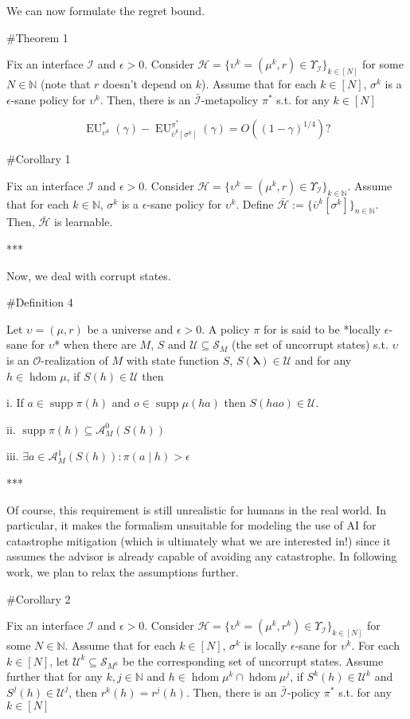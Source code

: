\documentclass[a4paper]{article}
\DeclareMathOperator{\Supp}{supp}
\newcommand{\Nats}{\mathbb{N}}
\newcommand{\Sq}[2]{\{#1\}_{#2 \in \Nats}}
\newcommand{\Sqn}[1]{\Sq{#1}{n}}
\newcommand{\Estr}{\boldsymbol{\lambda}}
\newcommand{\Ob}{\mathcal{O}}
\newcommand{\A}{\mathcal{A}}
\newcommand{\St}{\mathcal{S}}
\newcommand{\In}{\mathcal{I}}
\DeclareMathOperator{\HD}{hdom}
\newcommand{\Hy}{\mathcal{H}}
\newcommand{\UC}{\mathcal{U}}
\newcommand{\EU}{\operatorname{EU}}
\begin{document}
We can now formulate the regret bound.

\#Theorem 1

Fix an interface $\In$ and $\epsilon > 0$. Consider $\Hy = \{\upsilon^k = (\mu^k,r) \in \Upsilon_{\In}\}_{k \in [N]}$ for some $N \in \Nats$ (note that $r$ doesn't depend on $k$). Assume that for each $k \in [N]$, $\sigma^k$ is a $\epsilon$-sane policy for $\upsilon^k$. Then, there is an $\bar{\In}$-metapolicy $\pi^*$ s.t. for any $k \in [N]$

$$\EU_{\upsilon^k}^*(\gamma) - \EU_{\bar{\upsilon}^k\left[\sigma^k\right]}^{\pi^*}(\gamma) = O\left((1-\gamma)^{1/4}\right)?$$

\#Corollary 1

Fix an interface $\In$ and $\epsilon > 0$. Consider $\Hy = \{\upsilon^k = (\mu^k,r) \in \Upsilon_{\In}\}_{k \in \Nats}$. Assume that for each $k \in \Nats$, $\sigma^k$ is a $\epsilon$-sane policy for $\upsilon^k$. Define $\bar{\Hy}:=\Sqn{\bar{\upsilon}^k\left[\sigma^k\right]}$. Then, $\bar{\Hy}$ is learnable.

***

Now, we deal with corrupt states.

\#Definition 4

Let $\upsilon = (\mu,r)$ be a universe and $\epsilon > 0$. A policy $\pi$ for is said to be *locally $\epsilon$-sane for $\upsilon$* when there are $M$, $S$ and $\UC \subseteq \St_M$ (the set of uncorrupt states) s.t. $\upsilon$ is an $\Ob$-realization of $M$ with state function $S$, $S(\Estr) \in \UC$ and for any $h \in \HD{\mu}$, if $S(h) \in \UC$ then

i. If $a \in \Supp{\pi(h)}$ and $o \in \Supp{\mu(ha)}$ then $S\left(hao\right) \in \UC$.

ii. $\Supp{\pi(h)} \subseteq \A_M^0\left(S(h)\right)$

iii. $\exists a \in \A_M^1\left(S(h)\right): \pi(a \mid h) > \epsilon$

***

Of course, this requirement is still unrealistic for humans in the real world. In particular, it makes the formalism unsuitable for modeling the use of AI for catastrophe mitigation (which is ultimately what we are interested in!) since it assumes the advisor is already capable of avoiding any catastrophe. In following work, we plan to relax the assumptions further.

\#Corollary 2

Fix an interface $\In$ and $\epsilon > 0$. Consider $\Hy = \{\upsilon^k = (\mu^k,r^k) \in \Upsilon_{\In}\}_{k \in [N]}$ for some $N \in \Nats$. Assume that for each $k \in [N]$, $\sigma^k$ is locally $\epsilon$-sane for $\upsilon^k$. For each $k \in [N]$, let $\UC^k \subseteq \St_{M^k}$ be the corresponding set of uncorrupt states. Assume further that for any $k,j \in \Nats$ and $h \in \HD{\mu^k} \cap \HD{\mu^j}$, if $S^k(h) \in \UC^k$ and $S^j(h) \in \UC^j$, then $r^k(h)=r^j(h)$. Then, there is an $\bar{\In}$-policy $\pi^*$ s.t. for any $k \in [N]$
\end{document}

